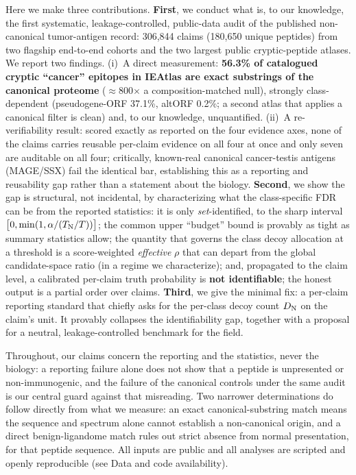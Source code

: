 Here we make three contributions. \textbf{First}, we conduct what is, to our knowledge, the first systematic, leakage-controlled, public-data audit of the published non-canonical tumor-antigen record: 306{,}844 claims (180{,}650 unique peptides) from two flagship end-to-end cohorts and the two largest public cryptic-peptide atlases. We report two findings. (i)~A direct measurement: \textbf{56.3\% of catalogued cryptic ``cancer'' epitopes in IEAtlas are exact substrings of the canonical proteome} ($\approx$800$\times$ a composition-matched null), strongly class-dependent (pseudogene-ORF 37.1\%, altORF 0.2\%; a second atlas that applies a canonical filter is clean) and, to our knowledge, unquantified. (ii)~A re-verifiability result: scored exactly as reported on the four evidence axes, none of the claims carries reusable per-claim evidence on all four at once and only seven are auditable on all four; critically, known-real canonical cancer-testis antigens (MAGE/SSX) fail the identical bar, establishing this as a reporting and reusability gap rather than a statement about the biology. \textbf{Second}, we show the gap is structural, not incidental, by characterizing what the class-specific FDR can be from the reported statistics: it is only \emph{set}-identified, to the sharp interval $\bigl[0,\min(1,\alpha/(T_{\mathrm{N}}/T))\bigr]$; the common upper ``budget'' bound is provably as tight as summary statistics allow; the quantity that governs the class decoy allocation at a threshold is a score-weighted \emph{effective} $\rho$ that can depart from the global candidate-space ratio (in a regime we characterize); and, propagated to the claim level, a calibrated per-claim truth probability is \textbf{not identifiable}; the honest output is a partial order over claims. \textbf{Third}, we give the minimal fix: a per-claim reporting standard that chiefly asks for the per-class decoy count $D_{\mathrm{N}}$ on the claim's unit. It provably collapses the identifiability gap, together with a proposal for a neutral, leakage-controlled benchmark for the field.

Throughout, our claims concern the reporting and the statistics, never the biology: a reporting failure alone does not show that a peptide is unpresented or non-immunogenic, and the failure of the canonical controls under the same audit is our central guard against that misreading. Two narrower determinations do follow directly from what we measure: an exact canonical-substring match means the sequence and spectrum alone cannot establish a non-canonical origin, and a direct benign-ligandome match rules out strict absence from normal presentation, for that peptide sequence. All inputs are public and all analyses are scripted and openly reproducible (see Data and code availability).

